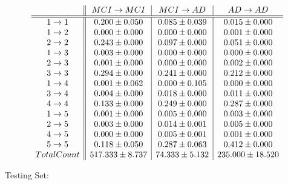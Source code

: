 \documentclass[12pt,a4paper]{article}
\begin{document}
\[ \begin{array}{ c || c | c | c }
& MCI \rightarrow MCI & MCI \rightarrow AD & AD \rightarrow AD \\
\hline
\hline
1 \rightarrow 1 & 0.200 \pm 0.050 & 0.085 \pm 0.039 & 0.015 \pm 0.000 \\
1 \rightarrow 2 & 0.000 \pm 0.000 & 0.000 \pm 0.000 & 0.001 \pm 0.000 \\
2 \rightarrow 2 & 0.243 \pm 0.000 & 0.097 \pm 0.000 & 0.051 \pm 0.000 \\
1 \rightarrow 3 & 0.003 \pm 0.000 & 0.000 \pm 0.000 & 0.000 \pm 0.000 \\
2 \rightarrow 3 & 0.001 \pm 0.000 & 0.000 \pm 0.000 & 0.002 \pm 0.000 \\
3 \rightarrow 3 & 0.294 \pm 0.000 & 0.241 \pm 0.000 & 0.212 \pm 0.000 \\
1 \rightarrow 4 & 0.001 \pm 0.062 & 0.000 \pm 0.105 & 0.000 \pm 0.000 \\
3 \rightarrow 4 & 0.004 \pm 0.000 & 0.018 \pm 0.000 & 0.011 \pm 0.000 \\
4 \rightarrow 4 & 0.133 \pm 0.000 & 0.249 \pm 0.000 & 0.287 \pm 0.000 \\
1 \rightarrow 5 & 0.001 \pm 0.000 & 0.005 \pm 0.000 & 0.003 \pm 0.000 \\
2 \rightarrow 5 & 0.003 \pm 0.000 & 0.014 \pm 0.001 & 0.005 \pm 0.000 \\
4 \rightarrow 5 & 0.000 \pm 0.000 & 0.005 \pm 0.001 & 0.001 \pm 0.000 \\
5 \rightarrow 5 & 0.118 \pm 0.050 & 0.287 \pm 0.063 & 0.412 \pm 0.000 \\
Total Count & 517.333 \pm 8.737 & 74.333 \pm 5.132 & 235.000 \pm 18.520 \\
\end{array} \]

Testing Set:
\end{document}
